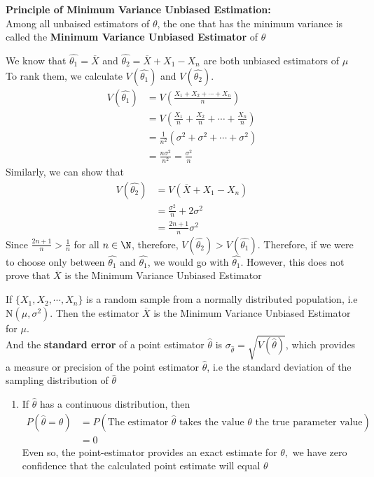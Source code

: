 \begin{thm}
\textbf{Principle of Minimum Variance Unbiased Estimation:}\\
Among all unbaised estimators of $\theta$,  the one that has the minimum variance is called the \textbf{Minimum Variance Unbiased Estimator} of $\theta$
\end{thm}
\begin{ex}
We know that $\widehat{\theta_1}=\overline{X}$ and $\widehat{\theta_2}=\overline{X}+X_1-X_n$ are both unbiased estimators of $\mu$\\
To rank them, we calculate $V(\widehat{\theta_1})$ and $V(\widehat{\theta_2})$. \begin{align*}
V(\widehat{\theta_1})&=V\left(\frac{X_1+X_2+\cdots+X_n}{n} \right)\\
&=V\left(\frac{X_1}{n}+\frac{X_2}{n}+\cdots+\frac{X_n}{n}\right)\\
&=\frac{1}{n^2}\left(\sigma^2+\sigma^2+\cdots+\sigma^2 \right)\\
&=\frac{n\sigma^2}{n^2}=\frac{\sigma^2}{n}
\end{align*}
Similarly, we can show that \begin{align*}
V(\widehat{\theta_2})&=V(\overline{X}+X_1-X_n)\\
&=\frac{\sigma^2}{n}+2\sigma^2\\
&=\frac{2n+1}{n}\sigma^2
\end{align*}
Since $\frac{2n+1}{n}>\frac{1}{n}$ for all $n\in \N$, therefore, $V(\widehat{\theta_2})>V(\widehat{\theta_1})$. Therefore, if we were to choose only between $\widehat{\theta_1}$ and $\widehat{\theta_1}$, we would go with $\widehat{\theta_1}$. However, this does not prove that $\overline{X}$ is the Minimum Variance Unbiased Estimator
\end{ex}
\begin{thm}
If $\{X_1,X_2,\cdots,X_n\}$ is a random sample from a normally distributed population, i.e N$(\mu,\sigma^2)$. Then the estimator $\overline{X}$ is the  Minimum Variance Unbiased Estimator for $\mu$.\\
And the \textbf{standard error} of a point estimator $\widehat{\theta}$ is $\sigma_{\widehat{\theta}}=\sqrt{V(\widehat{\theta})}$, which provides a measure or precision of the point estimator $\widehat{\theta}$, i.e the standard deviation of the sampling distribution of $\widehat{\theta}$
\end{thm}
\note \begin{enumerate}
\item If $\widehat{\theta}$ has a continuous distribution, then \begin{align*}
P(\widehat{\theta}=\theta)&=P(\text{The estimator }\widehat{\theta}\text{ takes the value }\theta \text{ the true parameter value})\\
&=0
\end{align*}
Even so, the point-estimator provides an exact estimate for $\theta,$ we have zero confidence that the calculated point estimate will equal $\theta$
\end{enumerate}
